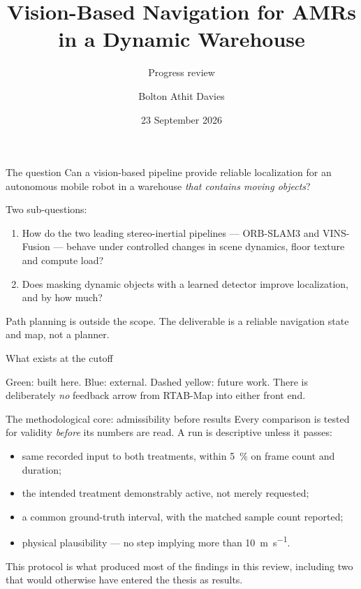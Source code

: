 \documentclass[aspectratio=169,11pt]{beamer}
\title{Vision-Based Navigation for AMRs\\in a Dynamic Warehouse}
\subtitle{Progress review}
\author{Bolton Athit Davies}
\date{23 September 2026}
\begin{document}
\maketitle

\begin{frame}{The question}
  Can a vision-based pipeline provide reliable localization for an autonomous
  mobile robot in a warehouse \emph{that contains moving objects}?

  \vspace{1em}
  Two sub-questions:
  \begin{enumerate}
    \item How do the two leading stereo-inertial pipelines --- ORB-SLAM3 and
      VINS-Fusion --- behave under controlled changes in scene dynamics, floor
      texture and compute load?
    \item Does masking dynamic objects with a learned detector improve
      localization, and by how much?
  \end{enumerate}

  \vspace{1em}
  \alert{Path planning is outside the scope.} The deliverable is a reliable
  navigation state and map, not a planner.
\end{frame}

\begin{frame}{What exists at the cutoff}
  \centering
  \resizebox{0.80\textwidth}{!}{}

  \vspace{0.3em}
  \footnotesize Green: built here. Blue: external. Dashed yellow: future work.
  There is deliberately \emph{no} feedback arrow from RTAB-Map into either front
  end.
\end{frame}

\begin{frame}{The methodological core: admissibility before results}
  Every comparison is tested for validity \emph{before} its numbers are read.
  A run is descriptive unless it passes:

  \vspace{0.8em}
  \begin{itemize}
    \item same recorded input to both treatments, within \SI{5}{\percent} on
      frame count and duration;
    \item the intended treatment demonstrably active, not merely requested;
    \item a common ground-truth interval, with the matched sample count reported;
    \item physical plausibility --- no step implying more than
      \SI{10}{\metre\per\second}.
  \end{itemize}

  \vspace{0.8em}
  This protocol is what produced most of the findings in this review, including
  two that would otherwise have entered the thesis as results.
\end{frame}
\end{document}
